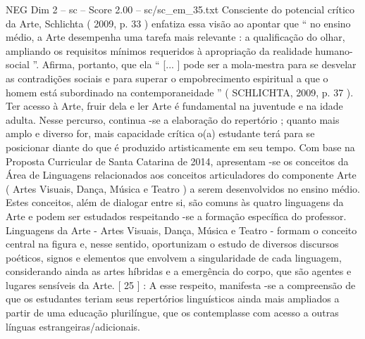 \begin{textsample}{NEG Dim 2 – sc – Score 2.00 – sc/sc\_em\_35.txt}
Consciente do potencial crítico da Arte, Schlichta ( 2009, p. 33 ) enfatiza essa visão ao apontar que “ no ensino médio, a Arte desempenha uma tarefa mais relevante : a qualificação do olhar, ampliando os requisitos mínimos requeridos à apropriação da realidade humano-social ”.
Afirma, portanto, que ela “ [... ] pode ser a mola-mestra para se desvelar as contradições sociais e para superar o empobrecimento espiritual a que o homem está subordinado na contemporaneidade ” ( SCHLICHTA, 2009, p. 37 ).
Ter acesso à Arte, fruir dela e ler Arte é fundamental na juventude e na idade adulta.
Nesse percurso, continua -se a elaboração do repertório ; quanto mais amplo e diverso for, mais capacidade crítica o(a) estudante terá para se posicionar diante do que é produzido artisticamente em seu tempo.
Com base na Proposta Curricular de Santa Catarina de 2014, apresentam -se os conceitos da Área de Linguagens relacionados aos conceitos articuladores do componente Arte ( Artes Visuais, Dança, Música e Teatro ) a serem desenvolvidos no ensino médio.
Estes conceitos, além de dialogar entre si, são comuns às quatro linguagens da Arte e podem ser estudados respeitando -se a formação específica do professor.
Linguagens da Arte - Artes Visuais, Dança, Música e Teatro - formam o conceito central na figura e, nesse sentido, oportunizam o estudo de diversos discursos poéticos, signos e elementos que envolvem a singularidade de cada linguagem, considerando ainda as artes híbridas e a emergência do corpo, que são agentes e lugares sensíveis da Arte. [ 25 ] : A esse respeito, manifesta -se a compreensão de que os estudantes teriam seus repertórios linguísticos ainda mais ampliados a partir de uma educação plurilíngue, que os contemplasse com acesso a outras línguas estrangeiras/adicionais.

\end{textsample}
